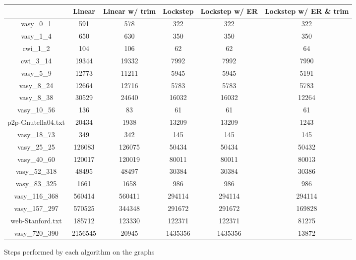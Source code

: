 \documentclass[../master/master.tex]{subfiles}
\begin{document}
\begin{figure}
\begin{tabular}{ |c||c||c||c||c||c|| } 
\hline
  & Linear & Linear w/ trim & Lockstep & Lockstep w/ ER & Lockstep w/ ER \& trim \\
\hline
 vasy\_0\_1 & 591 & 578 & 322 & 322 & 322 \\
\hline
 vasy\_1\_4 & 650 & 630 & 350 & 350 & 350 \\
\hline
 cwi\_1\_2 & 104 & 106 & 62 & 62 & 64 \\
\hline
 cwi\_3\_14 & 19344 & 19332 & 7992 & 7992 & 7990 \\
\hline
 vasy\_5\_9 & 12773 & 11211 & 5945 & 5945 & 5191 \\
\hline
 vasy\_8\_24 & 12664 & 12716 & 5783 & 5783 & 5783 \\
\hline
 vasy\_8\_38 & 30529 & 24640 & 16032 & 16032 & 12264 \\
\hline
 vasy\_10\_56 & 136 & 83 & 61 & 61 & 61 \\
\hline
 p2p-Gnutella04.txt & 20434 & 1938 & 13209 & 13209 & 1243 \\
\hline
 vasy\_18\_73 & 349 & 342 & 145 & 145 & 145 \\
\hline
 vasy\_25\_25 & 126083 & 126075 & 50434 & 50434 & 50432 \\
\hline
 vasy\_40\_60 & 120017 & 120019 & 80011 & 80011 & 80013 \\
\hline
 vasy\_52\_318 & 48495 & 48497 & 30384 & 30384 & 30386 \\
\hline
 vasy\_83\_325 & 1661 & 1658 & 986 & 986 & 986 \\
\hline
 vasy\_116\_368 & 560414 & 560411 & 294114 & 294114 & 294114 \\
\hline
 vasy\_157\_297 & 570525 & 344348 & 291672 & 291672 & 169828 \\
\hline
 web-Stanford.txt & 185712 & 123330 & 122371 & 122371 & 81275 \\
\hline
 vasy\_720\_390 & 2156545 & 20945 & 1435356 & 1435356 & 13872 \\
\hline
\end{tabular}
\caption{Steps performed by each algorithm on the graphs} \label{stepres}
\end{figure}
\end{document}
